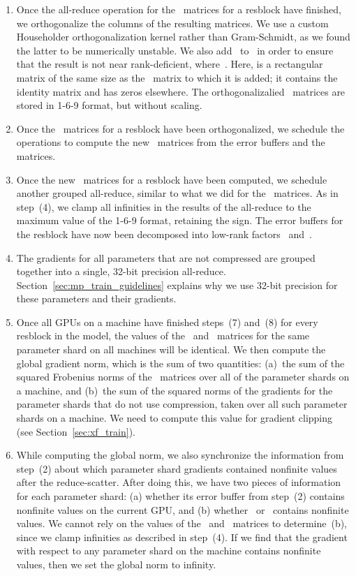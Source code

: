 \documentclass{article}
\begin{document}
\begin{enumerate}
    \item Once the all-reduce operation for the~ matrices for a resblock have finished, we orthogonalize the columns of the resulting matrices. We use a custom Householder orthogonalization kernel rather than Gram-Schmidt, as we found the latter to be numerically unstable. We also add~ to~ in order to ensure that the result is not near rank-deficient, where~. Here,  is a rectangular matrix of the same size as the~ matrix to which it is added; it contains the~ identity matrix and has zeros elsewhere. The orthogonalizalied~ matrices are stored in 1-6-9 format, but without scaling. 
    \item Once the~ matrices for a resblock have been orthogonalized, we schedule the operations to compute the new~ matrices from the error buffers and the~ matrices.
    \item Once the new~ matrices for a resblock have been computed, we schedule another grouped all-reduce, similar to what we did for the~ matrices. As in step~(4), we clamp all infinities in the results of the all-reduce to the maximum value of the 1-6-9 format, retaining the sign. The error buffers for the resblock have now been decomposed into low-rank factors~ and~.
    \item The gradients for all parameters that are not compressed are grouped together into a single, 32-bit precision all-reduce. Section~\ref{sec:mp_train_guidelines} explains why we use 32-bit precision for these parameters and their gradients.
    \item Once all GPUs on a machine have finished steps~(7) and~(8) for every resblock in the model, the values of the~ and~ matrices for the same parameter shard on all machines will be identical. We then compute the global gradient norm, which is the sum of two quantities: (a)~the sum of the squared Frobenius norms of the~ matrices over all of the parameter shards on a machine, and (b)~the sum of the squared norms of the gradients for the parameter shards that do not use compression, taken over all such parameter shards on a machine. We need to compute this value for gradient clipping (see Section~\ref{sec:xf_train}).
    \item While computing the global norm, we also synchronize the information from step~(2) about which parameter shard gradients contained nonfinite values after the reduce-scatter. After doing this, we have two pieces of information for each parameter shard: (a) whether its error buffer from step~(2) contains nonfinite values on the current GPU, and (b) whether~ or~ contains nonfinite values. We cannot rely on the values of the~ and~ matrices to determine~(b), since we clamp infinities as described in step~(4). If we find that the gradient with respect to any parameter shard on the machine contains nonfinite values, then we set the global norm to infinity.

\end{enumerate}
\end{document}
